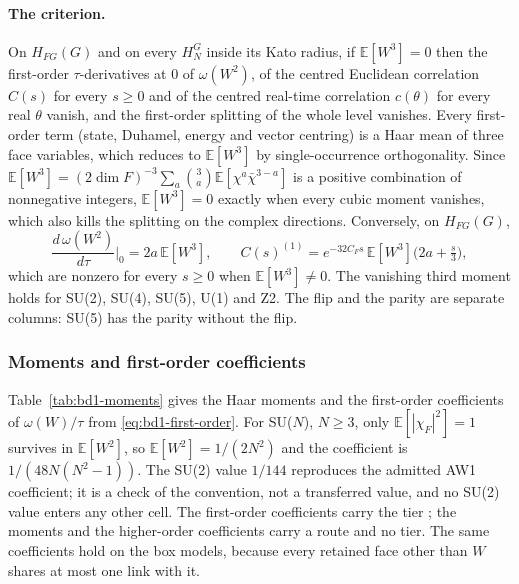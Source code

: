 \paragraph{The criterion.} On $H_{FG}(G)$ and on every $H^G_N$ inside its
Kato radius, if $\mathbb E[W^3]=0$ then the first-order $\tau$-derivatives at 0
of $\omega(W^2)$, of the centred Euclidean correlation $C(s)$ for every
$s\ge0$ and of the centred real-time correlation $c(\theta)$ for every real
$\theta$ vanish, and the first-order splitting of the whole level vanishes. Every first-order term (state, Duhamel, energy and
vector centring) is a Haar mean of three face variables, which reduces to
$\mathbb E[W^3]$ by single-occurrence orthogonality. Since
$\mathbb E[W^3]=(2\dim F)^{-3}\sum_a\binom3a\mathbb E[\chi^a\bar\chi^{3-a}]$ is a
positive combination of nonnegative integers, $\mathbb E[W^3]=0$ exactly when
every cubic moment vanishes, which also kills the splitting on the complex
directions. Conversely, on $H_{FG}(G)$,
\begin{equation}
 \frac{d\,\omega(W^2)}{d\tau}\Big|_0=2a\,\mathbb E[W^3],\qquad
 C(s)^{(1)}=e^{-32C_Fs}\,\mathbb E[W^3]\bigl(2a+\tfrac s3\bigr),
 \label{eq:bd1-parity}
\end{equation}
which are nonzero for every $s\ge0$ when $\mathbb E[W^3]\ne0$. The vanishing
third moment holds for SU(2), SU(4), SU(5), U(1) and Z2. The flip and the
parity are separate columns: SU(5) has the parity without the flip.

\subsubsection{Moments and first-order coefficients}
\label{sec:bd1-moments}
Table~\ref{tab:bd1-moments} gives the Haar moments and the first-order
coefficients of $\omega(W)/\tau$ from \eqref{eq:bd1-first-order}. For
SU($N$), $N\ge3$, only $\mathbb E[|\chi_F|^2]=1$ survives in $\mathbb E[W^2]$, so
$\mathbb E[W^2]=1/(2N^2)$ and the coefficient is $1/(48N(N^2-1))$. The SU(2)
value $1/144$ reproduces the admitted AW1 coefficient; it is a check of the
convention, not a transferred value, and no SU(2) value enters any other
cell. The first-order coefficients carry the tier
; the moments and the higher-order coefficients
carry a route and no tier. The same coefficients hold on the box models,
because every retained face other than $W$ shares at most one link with it.

